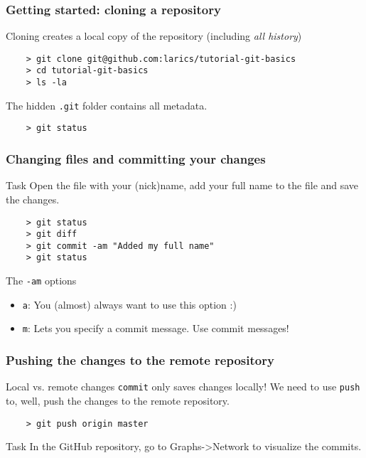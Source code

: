 
\begin{frame}[fragile]
	\frametitle{Getting started: cloning a repository}

	Cloning creates a local copy of the repository (including \emph{all history})	
	\begin{verbatim}
	> git clone git@github.com:larics/tutorial-git-basics
	> cd tutorial-git-basics
	> ls -la
	\end{verbatim}
	
	The hidden \texttt{.git} folder contains all metadata.
	
	\begin{verbatim}
	> git status
	\end{verbatim}
	
\end{frame}


\begin{frame}[fragile]
	\frametitle{Changing files and committing your changes}
	
	\begin{block}{Task}
	Open the file with your (nick)name, add your full name to the file and save the changes.
	\end{block}
	\begin{verbatim}
	> git status
	> git diff
	> git commit -am "Added my full name"
	> git status
	\end{verbatim}
	
	\begin{block}{The \texttt{-am} options}
	\begin{itemize}
		\item \texttt{a}: You (almost) always want to use this option :)
		\item \texttt{m}: Lets you specify a commit message. \alert{Use commit messages!}
	\end{itemize}
	\end{block}
	
\end{frame}


\begin{frame}[fragile]
	\frametitle{Pushing the changes to the remote repository}
	
	\begin{block}{Local vs. remote changes}
	\texttt{commit} only saves changes \alert{locally}! We need to use \texttt{push} to, well, push the changes to the remote repository. 
	\end{block}
	
	\begin{verbatim}
	> git push origin master
	\end{verbatim}
	
	\begin{block}{Task}
	In the GitHub repository, go to Graphs->Network to visualize the commits.
	\end{block}
\end{frame}

